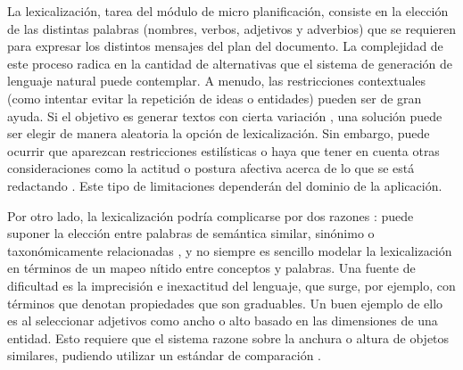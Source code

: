 La lexicalización, tarea del módulo de micro planificación, consiste en la elección de las distintas palabras (nombres, verbos, adjetivos y adverbios) que se requieren para expresar los distintos mensajes del plan del documento. La complejidad de este proceso radica en la cantidad de alternativas que el sistema de generación de lenguaje natural puede contemplar. A menudo, las restricciones contextuales (como intentar evitar la repetición de ideas o entidades) pueden ser de gran ayuda. Si el objetivo es generar textos con cierta variación \citep{theune2001data}, una solución puede ser elegir de manera aleatoria la opción de lexicalización. Sin embargo, puede ocurrir que aparezcan restricciones estilísticas o haya que tener en cuenta otras consideraciones como la actitud o postura afectiva acerca de lo que se está redactando \citep[Sección 5]{fleischman2002towards}. Este tipo de limitaciones dependerán del dominio de la aplicación.

Por otro lado, la lexicalización podría complicarse por dos razones \citep{bangalore2000corpus}: puede suponer la elección entre palabras de semántica similar, sinónimo o taxonómicamente relacionadas \citep{stede2000hyperonym, edmonds2002near}, y no siempre es sencillo modelar la lexicalización en términos de un mapeo nítido entre conceptos y palabras. Una fuente de dificultad es la imprecisión e inexactitud del lenguaje, que surge, por ejemplo, con términos que denotan propiedades que son graduables. Un buen ejemplo de ello es al seleccionar adjetivos como ancho o alto basado en las dimensiones de una entidad. Esto requiere que el sistema razone sobre la anchura o altura de objetos similares, pudiendo utilizar un estándar de comparación \citep{van2012not, kennedy2004scale}.

